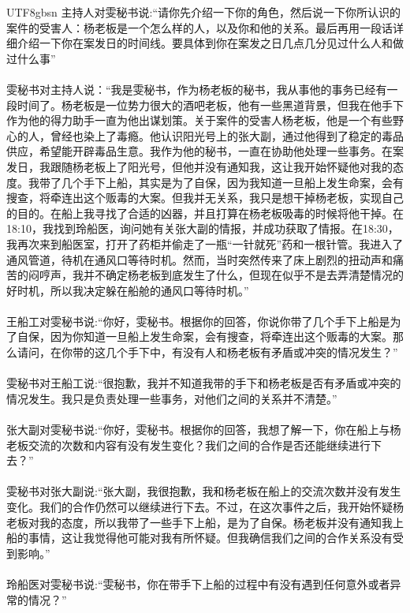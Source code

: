 \documentclass[11pt]{article}
\begin{document}
{\begin{CJK}{UTF8}{gbsn}
主持人对雯秘书说:``请你先介绍一下你的角色，然后说一下你所认识的案件的受害人：杨老板是一个怎么样的人，以及你和他的关系。最后再用一段话详细介绍一下你在案发日的时间线。要具体到你在案发之日几点几分见过什么人和做过什么事''\\ \\
雯秘书对主持人说：``我是雯秘书，作为杨老板的秘书，我从事他的事务已经有一段时间了。杨老板是一位势力很大的酒吧老板，他有一些黑道背景，但我在他手下作为他的得力助手一直为他出谋划策。关于案件的受害人杨老板，他是一个有些野心的人，曾经也染上了毒瘾。他认识阳光号上的张大副，通过他得到了稳定的毒品供应，希望能开辟毒品生意。我作为他的秘书，一直在协助他处理一些事务。在案发日，我跟随杨老板上了阳光号，但他并没有通知我，这让我开始怀疑他对我的态度。我带了几个手下上船，其实是为了自保，因为我知道一旦船上发生命案，会有搜查，将牵连出这个贩毒的大案。但我并无关系，我只是想干掉杨老板，实现自己的目的。在船上我寻找了合适的凶器，并且打算在杨老板吸毒的时候将他干掉。在18:10，我找到玲船医，询问她有关张大副的情报，并成功获取了情报。在18:30，我再次来到船医室，打开了药柜并偷走了一瓶“一针就死”药和一根针管。我进入了通风管道，待机在通风口等待时机。然而，当时突然传来了床上剧烈的扭动声和痛苦的闷哼声，我并不确定杨老板到底发生了什么，但现在似乎不是去弄清楚情况的好时机，所以我决定躲在船舱的通风口等待时机。''\\ \\
王船工对雯秘书说:``你好，雯秘书。根据你的回答，你说你带了几个手下上船是为了自保，因为你知道一旦船上发生命案，会有搜查，将牵连出这个贩毒的大案。那么请问，在你带的这几个手下中，有没有人和杨老板有矛盾或冲突的情况发生？''\\ \\
雯秘书对王船工说:``很抱歉，我并不知道我带的手下和杨老板是否有矛盾或冲突的情况发生。我只是负责处理一些事务，对他们之间的关系并不清楚。''\\ \\
张大副对雯秘书说:``你好，雯秘书。根据你的回答，我想了解一下，你在船上与杨老板交流的次数和内容有没有发生变化？我们之间的合作是否还能继续进行下去？''\\ \\
雯秘书对张大副说:``张大副，我很抱歉，我和杨老板在船上的交流次数并没有发生变化。我们的合作仍然可以继续进行下去。不过，在这次事件之后，我开始怀疑杨老板对我的态度，所以我带了一些手下上船，是为了自保。杨老板并没有通知我上船的事情，这让我觉得他可能对我有所怀疑。但我确信我们之间的合作关系没有受到影响。''\\ \\
玲船医对雯秘书说:``雯秘书，你在带手下上船的过程中有没有遇到任何意外或者异常的情况？''\\ \\

\end{CJK}}
\end{document}
